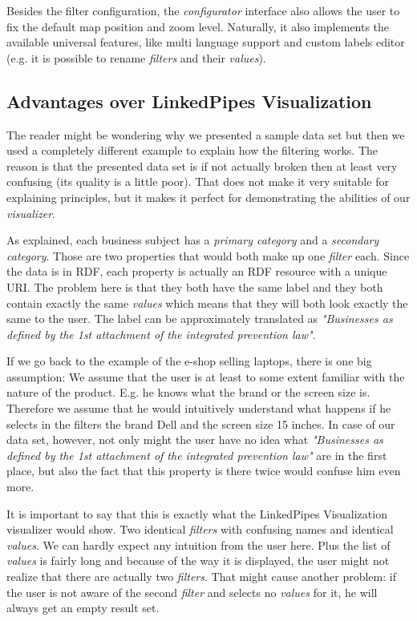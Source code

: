 Besides the filter configuration, the \emph{configurator} interface also allows the user to fix the default map position and zoom level. Naturally, it also implements the available universal features, like multi language support and custom labels editor (e.g. it is possible to rename \emph{filters}  and their \emph{values}).


\subsection{Advantages over LinkedPipes Visualization}

The reader might be wondering why we presented a sample data set but then we used a completely different example to explain how the filtering works. The reason is that the presented data set is if not actually broken then at least very confusing (its quality is a little poor). That does not make it very suitable for explaining principles, but it makes it perfect for demonstrating the abilities of our \emph{visualizer}.

As explained, each business subject has a \emph{primary category} and a \emph{secondary category}. Those are two properties that would both make up one \emph{filter} each. Since the data is in RDF, each property is actually an RDF resource with a unique URI. The problem here is that they both have the same label and they both contain exactly the same \emph{values} which means that they will both look exactly the same to the user. The label can be approximately translated as \textit{"Businesses as defined by the 1st attachment of the integrated prevention law"}.

If we go back to the example of the e-shop selling laptops, there is one big assumption: We assume that the user is at least to some extent familiar with the nature of the product. E.g. he knows what the brand or the screen size is. Therefore we assume that he would intuitively understand what happens if he selects in the filters the brand Dell and the screen size 15 inches. In case of our data set, however, not only might the user have no idea what \textit{"Businesses as defined by the 1st attachment of the integrated prevention law"} are in the first place, but also the fact that this property is there twice would confuse him even more. 

It is important to say that this is exactly what the LinkedPipes Visualization visualizer would show. Two identical \emph{filters} with confusing names and identical \emph{values}. We can hardly expect any intuition from the user here. Plus the list of \emph{values} is fairly long and because of the way it is displayed, the user might not realize that there are actually two \emph{filters}. That might cause another problem: if the user is not aware of the second \emph{filter} and selects no \emph{values} for it, he will always get an empty result set.

